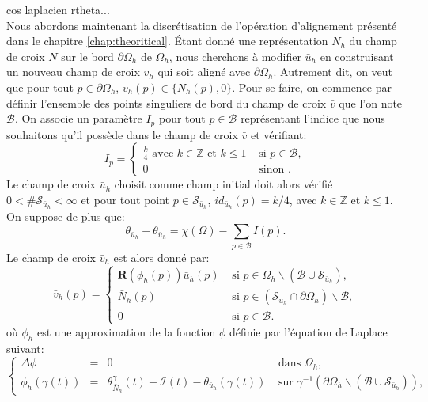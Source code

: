 cos laplacien rtheta...
\[\]
Nous abordons maintenant la discrétisation de l'opération d'alignement présenté dans le chapitre \ref{chap:theoritical}. Étant donné une représentation $\bar{N}_h$ du champ de croix $\bar{N}$ sur le bord $\partial\Omega_h$ de $\Omega_h$, nous cherchons à modifier $\bar{u}_h$ en construisant un nouveau champ de croix $\bar{v}_h$ qui soit aligné avec $\partial\Omega_h$. Autrement dit, on veut que pour tout $p\in\partial\Omega_h$, $\bar{v}_h(p)\in\{\bar{N}_h(p), 0\}$. Pour se faire, on commence par définir l'ensemble des points singuliers de bord du champ de croix $\bar{v}$ que l'on note $\mathcal{B}$. On associe un paramètre $I_p$ pour tout $p\in\mathcal{B}$ représentant l'indice que nous souhaitons qu'il possède dans le champ de croix $\bar{v}$ et vérifiant:
\begin{equation}
I_p=
\left\{
\begin{array}{ll}
\displaystyle\frac{k}{4}\mbox{ avec }k\in\mathbb{Z}\mbox{ et }k\leq 1&\mbox{ si }p\in\mathcal{B},\\[0.5cm]
0&\mbox{ sinon }.
\end{array}
\right.
\end{equation}
Le champ de croix $\bar{u}_h$ choisit comme champ initial doit alors vérifié $0<\#\mathcal{S}_{\bar{u}_h}<\infty$ et pour tout point $p\in\mathcal{S}_{\bar{u}_h}$, $id_{\bar{u}_h}(p)=k/4$, avec $k\in\mathbb{Z}$ et $k\leq 1$. On suppose de plus que:
\begin{equation} 
    \label{eqn:etude_hyp_u_simple}
    \theta_{\bar{u}_h}-\theta_{\bar{u}_h}=\chi(\Omega)-\sum_{p\in\mathcal{B}}I(p).
\end{equation}
Le champ de croix $\bar{v}_h$ est alors donné par:
\begin{equation}
\bar{v}_h(p)=
\left\{
\begin{array}{ll}
\mathbf{R}(\phi_h(p))\bar{u}_h(p) & \mbox{ si } p\in\Omega_h\backslash(\mathcal{B}\cup\mathcal{S}_{\bar{u}_h}),\\[0.5cm]
\bar{N}_h(p) & \mbox{ si } p\in(\mathcal{S}_{\bar{u}_h}\cap\partial\Omega_h)\backslash\mathcal{B},\\[0.5cm]
0 & \mbox{ si } p\in\mathcal{B}.
\end{array}
\right.
\label{eqn:etude_def_v_second}
\end{equation}
où $\phi_h$ est une approximation de la fonction $\phi$ définie par l'équation de Laplace suivant:\begin{equation}
\left\{
\begin{array}{lcll}
\Delta\phi &=& 0 &\mbox{ dans }\Omega_h,\\[0.5cm]
\phi_h(\gamma(t))&=&\theta^\gamma_{\bar{N}_h}(t)+\mathcal{I}(t)-\theta_{\bar{u}_h}(\gamma(t)) & \mbox{ sur } \gamma^{-1}(\partial\Omega_h\backslash(\mathcal{B}\cup\mathcal{S}_{\bar{u}_h})),
\end{array}
\right.
\end{equation}
